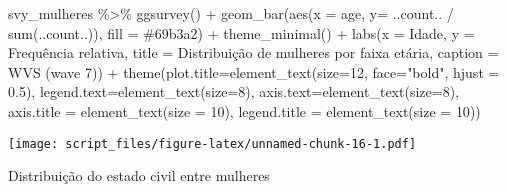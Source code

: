 \documentclass[
]{article}
\newenvironment{Shaded}{\begin{snugshade}}{\end{snugshade}}
\newcommand{\AttributeTok}[1]{\textcolor[rgb]{0.77,0.63,0.00}{#1}}
\newcommand{\DecValTok}[1]{\textcolor[rgb]{0.00,0.00,0.81}{#1}}
\newcommand{\FloatTok}[1]{\textcolor[rgb]{0.00,0.00,0.81}{#1}}
\newcommand{\FunctionTok}[1]{\textcolor[rgb]{0.00,0.00,0.00}{#1}}
\newcommand{\NormalTok}[1]{#1}
\newcommand{\SpecialCharTok}[1]{\textcolor[rgb]{0.00,0.00,0.00}{#1}}
\newcommand{\StringTok}[1]{\textcolor[rgb]{0.31,0.60,0.02}{#1}}
\begin{document}
\begin{Shaded}
\begin{Highlighting}[]
\NormalTok{svy\_mulheres }\SpecialCharTok{\%\textgreater{}\%}
  \FunctionTok{ggsurvey}\NormalTok{() }\SpecialCharTok{+}
  \FunctionTok{geom\_bar}\NormalTok{(}\FunctionTok{aes}\NormalTok{(}\AttributeTok{x =}\NormalTok{ age, }\AttributeTok{y=}\NormalTok{ ..count.. }\SpecialCharTok{/} \FunctionTok{sum}\NormalTok{(..count..)), }\AttributeTok{fill =} \StringTok{\textquotesingle{}\#69b3a2\textquotesingle{}}\NormalTok{) }\SpecialCharTok{+}
  \FunctionTok{theme\_minimal}\NormalTok{() }\SpecialCharTok{+}
  \FunctionTok{labs}\NormalTok{(}\AttributeTok{x =} \StringTok{\textquotesingle{}Idade\textquotesingle{}}\NormalTok{,}
       \AttributeTok{y =} \StringTok{\textquotesingle{}Frequência relativa\textquotesingle{}}\NormalTok{,}
       \AttributeTok{title =} \StringTok{\textquotesingle{}Distribuição de mulheres por faixa etária\textquotesingle{}}\NormalTok{,}
       \AttributeTok{caption =} \StringTok{\textquotesingle{}WVS (wave 7)\textquotesingle{}}\NormalTok{) }\SpecialCharTok{+}
  \FunctionTok{theme}\NormalTok{(}\AttributeTok{plot.title=}\FunctionTok{element\_text}\NormalTok{(}\AttributeTok{size=}\DecValTok{12}\NormalTok{, }\AttributeTok{face=}\StringTok{"bold"}\NormalTok{, }\AttributeTok{hjust =} \FloatTok{0.5}\NormalTok{),}
        \AttributeTok{legend.text=}\FunctionTok{element\_text}\NormalTok{(}\AttributeTok{size=}\DecValTok{8}\NormalTok{),}
        \AttributeTok{axis.text=}\FunctionTok{element\_text}\NormalTok{(}\AttributeTok{size=}\DecValTok{8}\NormalTok{),}
        \AttributeTok{axis.title =} \FunctionTok{element\_text}\NormalTok{(}\AttributeTok{size =} \DecValTok{10}\NormalTok{),}
        \AttributeTok{legend.title =} \FunctionTok{element\_text}\NormalTok{(}\AttributeTok{size =} \DecValTok{10}\NormalTok{))}
\end{Highlighting}
\end{Shaded}

\texttt{[image: script\_files/figure-latex/unnamed-chunk-16-1.pdf]}

Distribuição do estado civil entre mulheres
\end{document}
